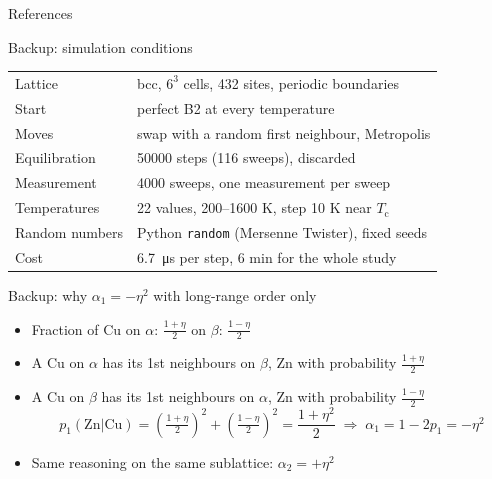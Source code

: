\documentclass[aspectratio=169, 11pt]{beamer}
\newcommand{\Cu}{\mathrm{Cu}}
\newcommand{\Zn}{\mathrm{Zn}}
\newcommand{\Tc}{T_\mathrm{c}}
\begin{document}
\begin{frame}[allowframebreaks]{References}
  \nocite{Sujet2026,BinderHeermann2019,Moss1964,KhanEisenbach2016}
  \printbibliography[heading=none]
\end{frame}

\appendix
\begin{frame}{Backup: simulation conditions}
  \small
  \begin{tabular}{ll}
    \toprule
    Lattice & bcc, $6^3$ cells, 432 sites, periodic boundaries \\
    Start & perfect B2 at every temperature \\
    Moves & swap with a random first neighbour, Metropolis \\
    Equilibration & \num{50000} steps (116 sweeps), discarded \\
    Measurement & 4000 sweeps, one measurement per sweep \\
    Temperatures & 22 values, 200--1600 K, step 10 K near $\Tc$ \\
    Random numbers & Python \texttt{random} (Mersenne Twister), fixed seeds \\
    Cost & \SI{6.7}{\micro s} per step, 6 min for the whole study \\
    \bottomrule
  \end{tabular}
\end{frame}

\begin{frame}{Backup: why \texorpdfstring{$\alpha_1 = -\eta^2$}{alpha1 = -eta2} with long-range order only}
  \begin{itemize}
    \item Fraction of Cu on $\alpha$: $\frac{1+\eta}{2}$ \quad on $\beta$: $\frac{1-\eta}{2}$
    \item A Cu on $\alpha$ has its 1st neighbours on $\beta$, Zn with probability $\frac{1+\eta}{2}$
    \item A Cu on $\beta$ has its 1st neighbours on $\alpha$, Zn with probability $\frac{1-\eta}{2}$
    \[ p_1(\Zn|\Cu) = \left(\tfrac{1+\eta}{2}\right)^2 + \left(\tfrac{1-\eta}{2}\right)^2 = \frac{1+\eta^2}{2}
       \;\Rightarrow\; \alpha_1 = 1 - 2p_1 = -\eta^2 \]
    \item Same reasoning on the same sublattice: $\alpha_2 = +\eta^2$
  \end{itemize}
\end{frame}
\end{document}
